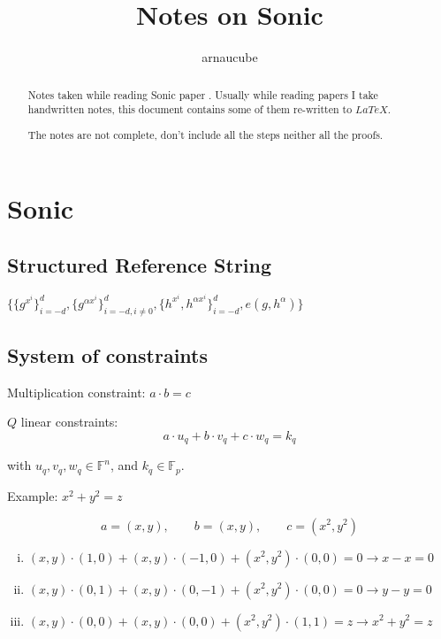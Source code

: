 \documentclass{article}
\title{Notes on Sonic}
\author{arnaucube}
\date{}
\theoremstyle{definition}
\begin{document}
\maketitle

\begin{abstract}
	Notes taken while reading Sonic paper \cite{cryptoeprint:2019/099}. Usually while reading papers I take handwritten notes, this document contains some of them re-written to $LaTeX$.

	The notes are not complete, don't include all the steps neither all the proofs.
\end{abstract}

\tableofcontents


\section{Sonic}

\subsection{Structured Reference String}
$\{ \{g^{x^i}\}_{i=-d}^d, \{ g^{\alpha x^i} \}_{i=-d, i \neq 0}^d, \{ h^{x^i}, h^{\alpha x^i} \}_{i=-d}^d, e(g, h^\alpha) \}$

\subsection{System of constraints}
Multiplication constraint: $a \cdot b = c$

$Q$ linear constraints:
$$
a \cdot u_q + b \cdot v_q + c \cdot w_q = k_q
$$

with $u_q, v_q, w_q \in \mathbb{F}^n$, and $k_q \in \mathbb{F}_p$.

\vspace{0.5cm}
Example: $x^2 + y^2 = z$

$$a = (x, y), \qquad b = (x, y), \qquad c = (x^2, y^2)$$
\begin{enumerate}[i.]
    \item $(x, y) \cdot (1, 0) + (x, y) \cdot (-1, 0) + (x^2, y^2) \cdot (0, 0) = 0 \longrightarrow x - x = 0$
    \item $(x, y) \cdot (0, 1) + (x, y) \cdot (0, -1) + (x^2, y^2) \cdot (0, 0) = 0 \longrightarrow y - y = 0$
    \item $(x, y) \cdot (0, 0) + (x, y) \cdot (0, 0) + (x^2, y^2) \cdot (1, 1) = z \longrightarrow x^2 + y^2 = z$
\end{enumerate}
\end{document}
